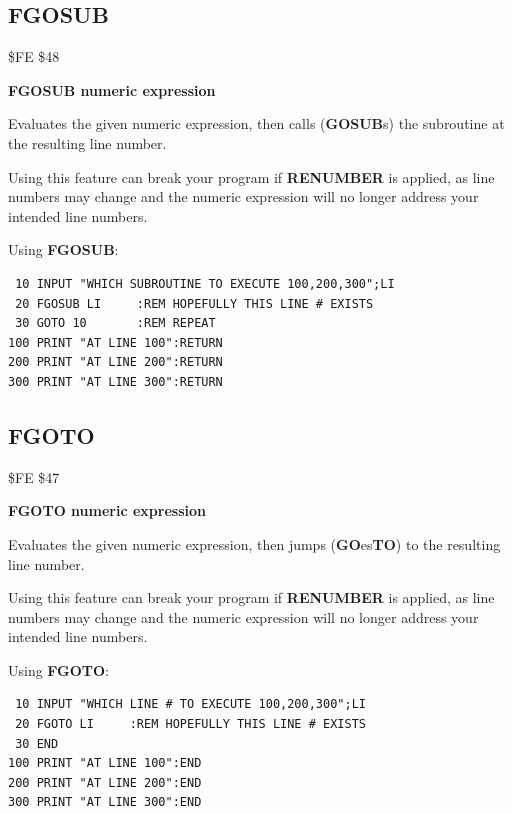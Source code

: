 \subsection{FGOSUB}
\begin{description}[leftmargin=2cm,style=nextline]
\item [Token:] \$FE \$48
\item [Format:] {\bf FGOSUB numeric expression}
\item [Usage:] Evaluates the given numeric expression, then calls ({\bf GOSUB}s) the subroutine at the resulting line number.

\item [Warning:] Using this feature can break your program if {\bf RENUMBER}
is applied, as line numbers may change and the
numeric expression will no longer address your intended line numbers.

\item [Example:] Using {\bf FGOSUB}:
\begin{tcolorbox}[colback=black,coltext=white]
\verbatimfont{\codefont}
\begin{verbatim}
 10 INPUT "WHICH SUBROUTINE TO EXECUTE 100,200,300";LI
 20 FGOSUB LI     :REM HOPEFULLY THIS LINE # EXISTS
 30 GOTO 10       :REM REPEAT
100 PRINT "AT LINE 100":RETURN
200 PRINT "AT LINE 200":RETURN
300 PRINT "AT LINE 300":RETURN
\end{verbatim}
\end{tcolorbox}
\end{description}


\newpage
\subsection{FGOTO}
\begin{description}[leftmargin=2cm,style=nextline]
\item [Token:] \$FE \$47
\item [Format:] {\bf FGOTO numeric expression}
\item [Usage:] Evaluates the given numeric expression, then jumps ({\bf GO}es{\bf TO}) to the resulting line number.

\item [Warning:] Using this feature can break your program if {\bf RENUMBER}
                 is applied, as line numbers may change and the
                 numeric expression will no longer address your intended line numbers.

\item [Example:] Using {\bf FGOTO}:
\begin{tcolorbox}[colback=black,coltext=white]
\verbatimfont{\codefont}
\begin{verbatim}
 10 INPUT "WHICH LINE # TO EXECUTE 100,200,300";LI
 20 FGOTO LI     :REM HOPEFULLY THIS LINE # EXISTS
 30 END
100 PRINT "AT LINE 100":END
200 PRINT "AT LINE 200":END
300 PRINT "AT LINE 300":END
\end{verbatim}
\end{tcolorbox}
\end{description}


